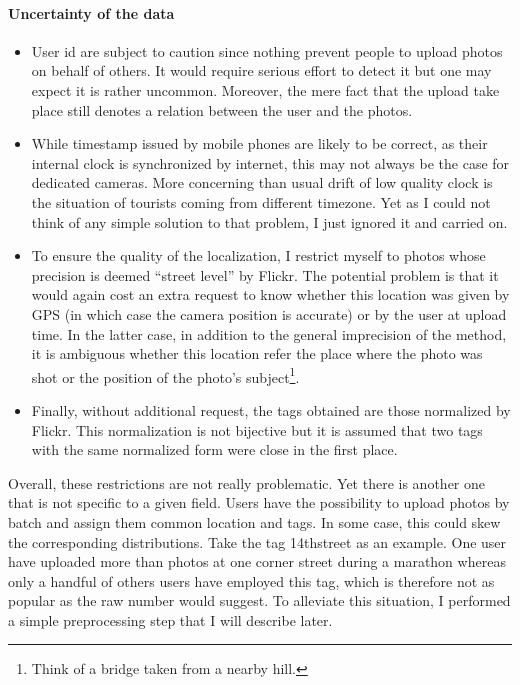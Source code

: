 \paragraph{Uncertainty of the data}
\label{p:data}
\begin{itemize}
	\item User id are subject to caution since nothing prevent people to
 upload photos on behalf of others. It would require serious effort to
 detect it but one may expect it is rather uncommon. Moreover, the mere
 fact that the upload take place still denotes a relation between the
 user and the photos.
	\item While timestamp issued by mobile phones are likely to be correct,
 as their internal clock is synchronized by internet, this may not
 always be the case for dedicated cameras. More concerning than usual
 drift of low quality clock is the situation of tourists coming from
 different timezone. Yet as I could not think of any simple solution to
 that problem, I just ignored it and carried on.
	\item To ensure the quality of the localization, I restrict myself to
 photos whose precision is deemed \enquote{street level} by Flickr. The
 potential problem is that it would again cost an extra request to know
 whether this location was given by GPS (in which case the camera
 position is accurate) or by the user at upload time. In the latter
 case, in addition to the general imprecision of the method, it is
 ambiguous whether this location refer the place where the photo was
 shot or the position of the photo's subject\footnote{Think of a bridge
 taken from a nearby hill.}.
	\item Finally, without additional request, the tags obtained are those
 normalized by Flickr. This normalization is not bijective but it is
 assumed that two tags with the same normalized form were close in the
 first place.
\end{itemize}

Overall, these restrictions are not really problematic. Yet there is another
one that is not specific to a given field. Users have the possibility to
upload photos by batch and assign them common location and tags. In some case,
this could skew the corresponding distributions. Take the tag
\textsf{14thstreet} as an example. One user have uploaded more than
 photos at one corner street during a marathon whereas only a
handful of others users have employed this tag, which is therefore not as
popular as the raw number would suggest. To alleviate this situation, I
performed a simple preprocessing step that I will describe later.

